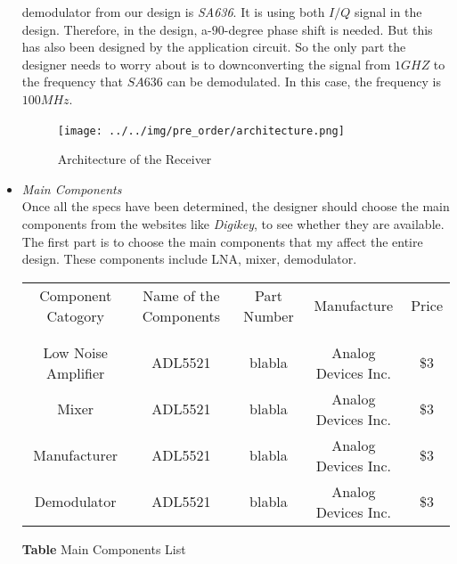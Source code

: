 \documentclass[]{article}
\begin{document}
\begin{itemize}
            demodulator from our design is \textit{SA636}. It is using both
            $I/Q$ signal in the design. Therefore, in the design, a-$90$-degree
            phase shift is needed. But this has also been designed by the
            application circuit. So the only part the designer needs to worry
            about is to downconverting the signal from $1GHZ$ to the frequency
            that $SA636$ can be demodulated. In this case, the frequency is
            $100MHz$.
            \begin{figure}[p]
                \begin{center}
                    \texttt{[image: ../../img/pre\_order/architecture.png]}~
                    \label{architecture}
                    \caption{Architecture of the Receiver}
                \end{center}
            \end{figure}
        \item \textit{Main Components} \\
            Once all the specs have been determined, the designer should choose
            the main components from the websites like \textit{Digikey}, to see
            whether they are available. The first part is to choose the main
            components that my affect the entire design. These components
            include LNA, mixer, demodulator.

            \begin{center}
                \begin{tabular}{c c c c c}
                    Component Catogory & Name of the Components & Part Number &
                    Manufacture & Price \\ \\ \hline \\
                    Low Noise Amplifier & ADL5521 & blabla & Analog Devices Inc.
                    & \$3 \\
                    Mixer & ADL5521 & blabla & Analog Devices Inc. & \$3 \\
                    Manufacturer & ADL5521 & blabla & Analog Devices Inc. & \$3
                    \\
                    Demodulator & ADL5521 & blabla & Analog Devices Inc. & \$3
                    \\
                \end{tabular}
            \end{center}

            \begin{center}
                \textbf{Table} Main Components List 
            \end{center}


\end{itemize}
\end{document}
